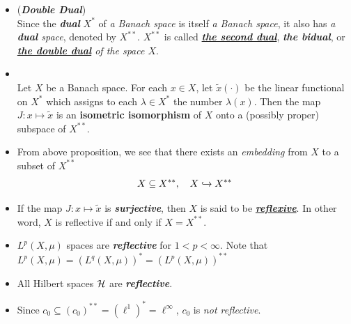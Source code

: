 \documentclass[11pt]{article}
\begin{document}
\begin{itemize}
\item \begin{definition} (\emph{\textbf{Double Dual}})\\
Since the \emph{\textbf{dual}} $X^{*}$ of \emph{a Banach space} is itself \textit{a Banach space}, it also has \emph{a \textbf{dual} space}, denoted by $X^{**}$. $X^{**}$ is called \underline{\emph{\textbf{the second dual}}}, \emph{\textbf{the bidual}}, or \emph{\textbf{\underline{the double dual}} of the space $X$}.
\end{definition}

\item \begin{proposition} \citep{reed1980methods}\\
Let $X$ be a Banach space. For each $x \in X$, let $\widetilde{x}(\cdot)$ be the linear functional on $X^{*}$ which assigns to each $\lambda \in X^{*}$ the number $\lambda(x)$. Then the map $J: x \mapsto \widetilde{x}$ is an \textbf{isometric isomorphism} of $X$ onto a (possibly proper) subspace of $X^{**}$.
\end{proposition}

\item \begin{remark}
From above proposition, we see that there exists an \emph{embedding} from $X$ to a subset of $X^{**}$
\begin{align*}
X \subseteq X^{**}, \quad X \xhookrightarrow{} X^{**}
\end{align*}
\end{remark}

\item \begin{definition}
If the map $J: x \mapsto \widetilde{x}$ is \emph{\textbf{surjective}}, then $X$ is said to be \underline{\emph{\textbf{reflexive}}}. In other word, $X$ is reflective if and only if $X = X^{**}$.
\end{definition}

\item \begin{example}
$L^{p}(X, \mu)$ spaces are \emph{\textbf{reflective}} for $1 < p < \infty$. Note that $L^{p}(X, \mu) = (L^{q}(X, \mu))^{*} =  (L^{p}(X, \mu))^{**}$
\end{example}

\item \begin{example}
All Hilbert spaces ${\mathcal H}$ are \emph{\textbf{reflective}}.
\end{example}

\item \begin{example}
Since $c_0 \subseteq  (c_0)^{**} = (\ell^1)^{*} = \ell^{\infty}$, $c_0$ is \emph{not reflective}.
\end{example}
\end{itemize}
\end{document}
